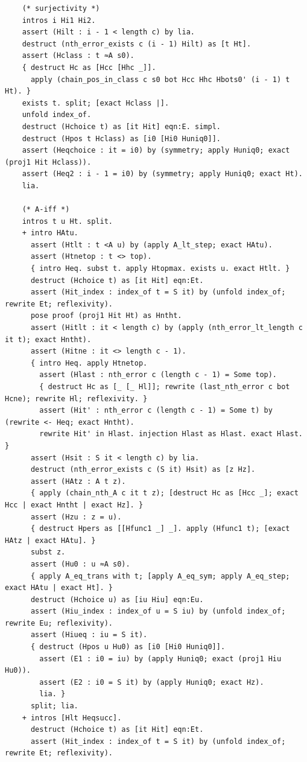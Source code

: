 \begin{latin}
\begin{verbatim}
    (* surjectivity *)
    intros i Hi1 Hi2.
    assert (Hilt : i - 1 < length c) by lia.
    destruct (nth_error_exists c (i - 1) Hilt) as [t Ht].
    assert (Hclass : t ≈A s0).
    { destruct Hc as [Hcc [Hhc _]].
      apply (chain_pos_in_class c s0 bot Hcc Hhc Hbots0' (i - 1) t Ht). }
    exists t. split; [exact Hclass |].
    unfold index_of.
    destruct (Hchoice t) as [it Hit] eqn:E. simpl.
    destruct (Hpos t Hclass) as [i0 [Hi0 Huniq0]].
    assert (Heqchoice : it = i0) by (symmetry; apply Huniq0; exact (proj1 Hit Hclass)).
    assert (Heq2 : i - 1 = i0) by (symmetry; apply Huniq0; exact Ht).
    lia.

    (* A-iff *)
    intros t u Ht. split.
    + intro HAtu.
      assert (Htlt : t <A u) by (apply A_lt_step; exact HAtu).
      assert (Htnetop : t <> top).
      { intro Heq. subst t. apply Htopmax. exists u. exact Htlt. }
      destruct (Hchoice t) as [it Hit] eqn:Et.
      assert (Hit_index : index_of t = S it) by (unfold index_of; rewrite Et; reflexivity).
      pose proof (proj1 Hit Ht) as Hntht.
      assert (Hitlt : it < length c) by (apply (nth_error_lt_length c it t); exact Hntht).
      assert (Hitne : it <> length c - 1).
      { intro Heq. apply Htnetop.
        assert (Hlast : nth_error c (length c - 1) = Some top).
        { destruct Hc as [_ [_ Hl]]; rewrite (last_nth_error c bot Hcne); rewrite Hl; reflexivity. }
        assert (Hit' : nth_error c (length c - 1) = Some t) by (rewrite <- Heq; exact Hntht).
        rewrite Hit' in Hlast. injection Hlast as Hlast. exact Hlast. }
      assert (Hsit : S it < length c) by lia.
      destruct (nth_error_exists c (S it) Hsit) as [z Hz].
      assert (HAtz : A t z).
      { apply (chain_nth_A c it t z); [destruct Hc as [Hcc _]; exact Hcc | exact Hntht | exact Hz]. }
      assert (Hzu : z = u).
      { destruct Hpers as [[Hfunc1 _] _]. apply (Hfunc1 t); [exact HAtz | exact HAtu]. }
      subst z.
      assert (Hu0 : u ≈A s0).
      { apply A_eq_trans with t; [apply A_eq_sym; apply A_eq_step; exact HAtu | exact Ht]. }
      destruct (Hchoice u) as [iu Hiu] eqn:Eu.
      assert (Hiu_index : index_of u = S iu) by (unfold index_of; rewrite Eu; reflexivity).
      assert (Hiueq : iu = S it).
      { destruct (Hpos u Hu0) as [i0 [Hi0 Huniq0]].
        assert (E1 : i0 = iu) by (apply Huniq0; exact (proj1 Hiu Hu0)).
        assert (E2 : i0 = S it) by (apply Huniq0; exact Hz).
        lia. }
      split; lia.
    + intros [Hlt Heqsucc].
      destruct (Hchoice t) as [it Hit] eqn:Et.
      assert (Hit_index : index_of t = S it) by (unfold index_of; rewrite Et; reflexivity).

\end{verbatim}
\end{latin}
